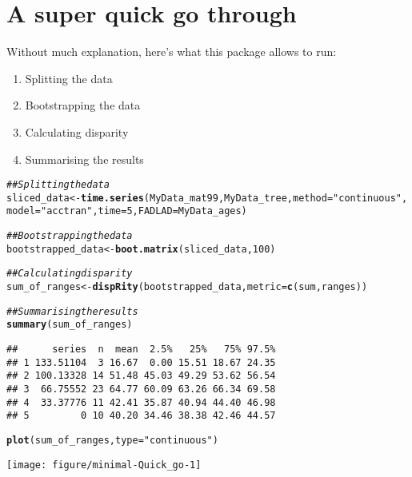 \documentclass{article}\usepackage[]{graphicx}\usepackage[]{color}
\makeatletter
\newcommand{\hlnum}[1]{\textcolor[rgb]{0.686,0.059,0.569}{#1}}%
\newcommand{\hlstr}[1]{\textcolor[rgb]{0.192,0.494,0.8}{#1}}%
\newcommand{\hlcom}[1]{\textcolor[rgb]{0.678,0.584,0.686}{\textit{#1}}}%
\newcommand{\hlstd}[1]{\textcolor[rgb]{0.345,0.345,0.345}{#1}}%
\newcommand{\hlkwb}[1]{\textcolor[rgb]{0.69,0.353,0.396}{#1}}%
\newcommand{\hlkwc}[1]{\textcolor[rgb]{0.333,0.667,0.333}{#1}}%
\newcommand{\hlkwd}[1]{\textcolor[rgb]{0.737,0.353,0.396}{\textbf{#1}}}%
\newenvironment{kframe}{%
 \def\at@end@of@kframe{}%
 \ifinner\ifhmode%
  \def\at@end@of@kframe{\end{minipage}}%
  \begin{minipage}{\columnwidth}%
 \fi\fi%
 \def\FrameCommand##1{\hskip\@totalleftmargin \hskip-\fboxsep
 \colorbox{shadecolor}{##1}\hskip-\fboxsep
     \hskip-\linewidth \hskip-\@totalleftmargin \hskip\columnwidth}%
 \MakeFramed {\advance\hsize-\width
   \@totalleftmargin\z@ \linewidth\hsize
   \@setminipage}}%
 {\par\unskip\endMakeFramed%
 \at@end@of@kframe}
\newenvironment{knitrout}{}{} %
\makeatother
\begin{document}
\section{A super quick go through}
Without much explanation, here's what this package allows to run:
\begin{enumerate}
    \item Splitting the data
    \item Bootstrapping the data
    \item Calculating disparity
    \item Summarising the results
\end{enumerate}

\begin{knitrout}
\color{fgcolor}\begin{kframe}
\begin{alltt}
\hlcom{## Splitting the data}
\hlstd{sliced_data} \hlkwb{<-} \hlkwd{time.series}\hlstd{(MyData_mat99, MyData_tree,} \hlkwc{method} \hlstd{=} \hlstr{"continuous"}\hlstd{,}
    \hlkwc{model} \hlstd{=} \hlstr{"acctran"}\hlstd{,} \hlkwc{time} \hlstd{=} \hlnum{5}\hlstd{,} \hlkwc{FADLAD} \hlstd{= MyData_ages)}
\end{alltt}


{\ttfamily\noindent\itshape\color{messagecolor}{\#\# Some tips have FAD/LAD and are assumed to interval single points in time.}}\begin{alltt}
\hlcom{## Bootstrapping the data}
\hlstd{bootstrapped_data} \hlkwb{<-} \hlkwd{boot.matrix}\hlstd{(sliced_data,} \hlnum{100}\hlstd{)}

\hlcom{## Calculating disparity}
\hlstd{sum_of_ranges} \hlkwb{<-} \hlkwd{dispRity}\hlstd{(bootstrapped_data,} \hlkwc{metric} \hlstd{=} \hlkwd{c}\hlstd{(sum, ranges))}

\hlcom{## Summarising the results}
\hlkwd{summary}\hlstd{(sum_of_ranges)}
\end{alltt}
\begin{verbatim}
##      series  n  mean  2.5%   25%   75% 97.5%
## 1 133.51104  3 16.67  0.00 15.51 18.67 24.35
## 2 100.13328 14 51.48 45.03 49.29 53.62 56.54
## 3  66.75552 23 64.77 60.09 63.26 66.34 69.58
## 4  33.37776 11 42.41 35.87 40.94 44.40 46.98
## 5         0 10 40.20 34.46 38.38 42.46 44.57
\end{verbatim}
\begin{alltt}
\hlkwd{plot}\hlstd{(sum_of_ranges,} \hlkwc{type} \hlstd{=} \hlstr{"continuous"}\hlstd{)}
\end{alltt}
\end{kframe}

{\centering \texttt{[image: figure/minimal-Quick\_go-1]} 

}



\end{knitrout}
\end{document}
